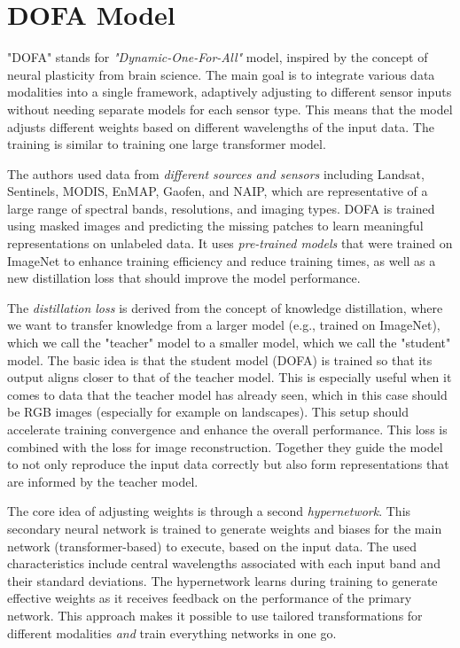 
\section{DOFA Model}
\label{sec:dofa}

"DOFA" stands for \emph{"Dynamic-One-For-All"} model, inspired by the concept of neural plasticity from brain science. The main goal is to integrate various data modalities into a single framework, adaptively adjusting to different sensor inputs without needing separate models for each sensor type. This means that the model adjusts different weights based on different wavelengths of the input data. The training is similar to training one large transformer model.

The authors used data from \emph{different sources and sensors} including Landsat, Sentinels, MODIS, EnMAP, Gaofen, and NAIP, which are representative of a large range of spectral bands, resolutions, and imaging types. DOFA is trained using masked images and predicting the missing patches to learn meaningful representations on unlabeled data. It uses \emph{pre-trained models} that were trained on ImageNet to enhance training efficiency and reduce training times, as well as a new distillation loss that should improve the model performance.

The \emph{distillation loss} is derived from the concept of knowledge distillation, where we want to transfer knowledge from a larger model (e.g., trained on ImageNet), which we call the "teacher" model to a smaller model, which we call the "student" model. The basic idea is that the student model (DOFA) is trained so that its output aligns closer to that of the teacher model. This is especially useful when it comes to data that the teacher model has already seen, which in this case should be RGB images (especially for example on landscapes). This setup should accelerate training convergence and enhance the overall performance. This loss is combined with the loss for image reconstruction. Together they guide the model to not only reproduce the input data correctly but also form representations that are informed by the teacher model.

The core idea of adjusting weights is through a second \emph{hypernetwork}. This secondary neural network is trained to generate weights and biases for the main network (transformer-based) to execute, based on the input data. The used characteristics include central wavelengths associated with each input band and their standard deviations. The hypernetwork learns during training to generate effective weights as it receives feedback on the performance of the primary network. This approach makes it possible to use tailored transformations for different modalities \emph{and} train everything networks in one go.

